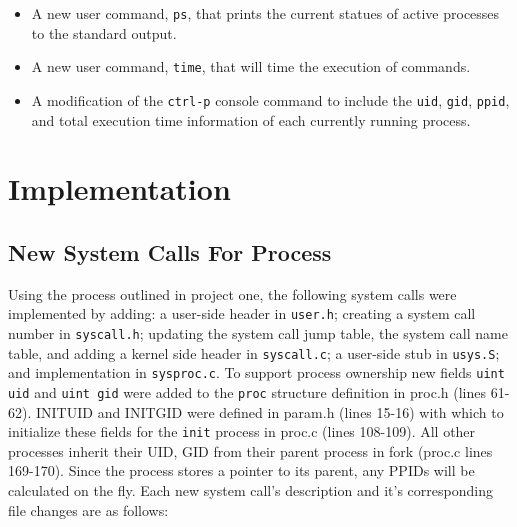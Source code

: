 \documentclass[11pt,letterpaper]{report}
\begin{document}
\begin{itemize}
	\item A new user command, {\tt ps}, that prints the current statues of active processes to the standard output.
	
	\item A new user command,  {\tt time}, that will time the execution of commands.
	
	\item A modification of the {\tt ctrl-p} console command to include the {\tt uid}, {\tt gid}, {\tt ppid}, and total execution time information of each 
		currently running process. 
		
	\end{itemize}
	
\newpage	
	\section*{Implementation}
	
	
	\subsection*{New System Calls For Process}
	Using the process outlined in project one, the following system calls were implemented by adding: a user-side header in {\tt user.h}; 
	creating a system call number in {\tt syscall.h}; updating the system call jump table, the system call name table, and adding a kernel side
	header in {\tt syscall.c}; 
	a user-side stub in {\tt usys.S}; and implementation in {\tt sysproc.c}. To support process ownership new fields {\tt uint uid} and {\tt uint gid}
	were added to the {\tt proc} structure definition in proc.h (lines 61-62). INITUID and INITGID
	were defined in param.h (lines 15-16) with which to initialize these fields for the {\tt init} process in proc.c (lines 108-109). All other processes
	inherit their UID, GID from their parent process in fork (proc.c lines 169-170). Since the process stores a pointer to its parent, any PPIDs will be 
	calculated on the fly. Each new system call's description and it's corresponding file changes are as follows:
\end{document}
